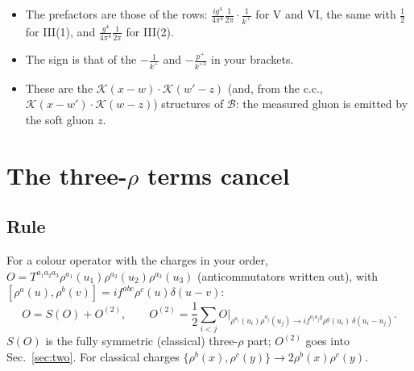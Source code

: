 \documentclass[10pt]{article}
\numberwithin{equation}{section}
\newcommand{\KK}{\mathcal K}
\newcommand{\BB}{\mathcal B}
\begin{document}
\begin{itemize}
\item The prefactors are those of the rows: $\frac{ig^4}{4\pi^4}\frac{1}{2\pi}\cdot\frac{1}{k^+}$ for V and VI, the same with $\frac12$ for III(1), and $\frac{g^4}{4\pi^4}\frac{1}{2\pi}$ for III(2).
\item The sign is that of the $-\frac{1}{k^+}$ and $-\frac{p^+}{k^{+2}}$ in your brackets.
\item These are the $\KK(x-w)\cdot\KK(w'-z)$ (and, from the c.c., $\KK(x-w')\cdot\KK(w-z)$) structures of $\BB$: the measured gluon is emitted by the soft gluon $z$.
\end{itemize}

\section{The three-\texorpdfstring{$\rho$}{rho} terms cancel}\label{sec:three}
\subsection{Rule}
For a colour operator with the charges in your order, $O=T^{a_1a_2a_3}\rho^{a_1}(u_1)\rho^{a_2}(u_2)\rho^{a_3}(u_3)$ (anticommutators written out), with $[\rho^a(u),\rho^b(v)]=if^{abc}\rho^c(u)\delta(u-v)$:
\begin{equation}
O=S(O)+O^{(2)},\qquad O^{(2)}=\frac12\sum_{i<j}O\Big|_{\rho^{a_i}(u_i)\rho^{a_j}(u_j)\to if^{a_ia_jg}\rho^g(u_i)\,\delta(u_i-u_j)}.
\label{eq:rule}
\end{equation}
$S(O)$ is the fully symmetric (classical) three-$\rho$ part; $O^{(2)}$ goes into Sec.~\ref{sec:two}. For classical charges $\{\rho^b(x),\rho^c(y)\}\to2\rho^b(x)\rho^c(y)$.
\end{document}
